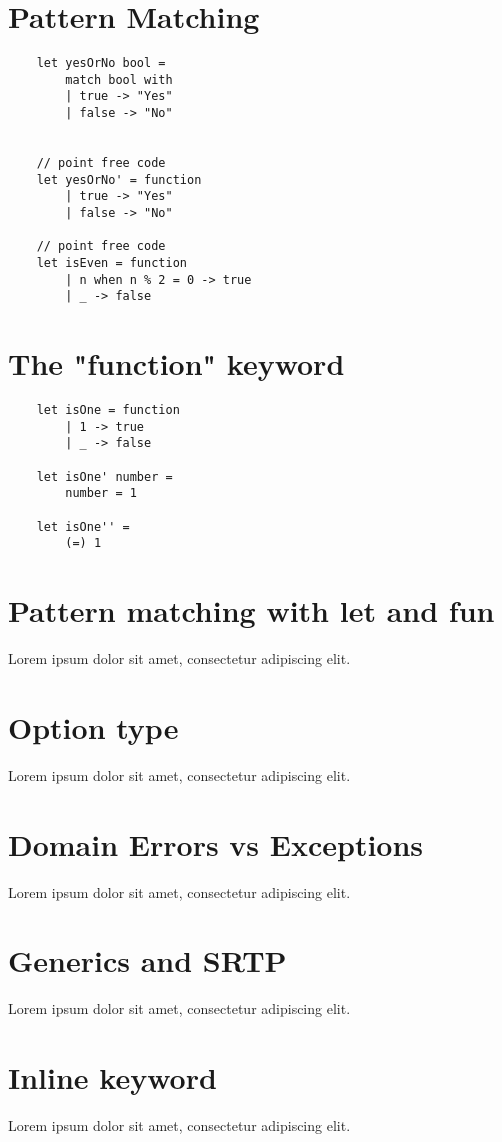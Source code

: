 \documentclass[a4paper,11pt]{article}
\begin{document}
\section{Pattern Matching}
\begin{lstlisting}
    let yesOrNo bool =
        match bool with
        | true -> "Yes"
        | false -> "No"


    // point free code
    let yesOrNo' = function
        | true -> "Yes"
        | false -> "No"

    // point free code
    let isEven = function
        | n when n % 2 = 0 -> true
        | _ -> false
\end{lstlisting}

\section{The "function" keyword}
\begin{lstlisting}
    let isOne = function
        | 1 -> true
        | _ -> false

    let isOne' number =
        number = 1

    let isOne'' = 
        (=) 1
\end{lstlisting}

\section{Pattern matching with let and fun}
Lorem ipsum dolor sit amet, consectetur adipiscing elit.
\section{Option type}
Lorem ipsum dolor sit amet, consectetur adipiscing elit.
\section{Domain Errors vs Exceptions}
Lorem ipsum dolor sit amet, consectetur adipiscing elit.
\section{Generics and SRTP}
Lorem ipsum dolor sit amet, consectetur adipiscing elit.
\section{Inline keyword}
Lorem ipsum dolor sit amet, consectetur adipiscing elit.
\end{document}
